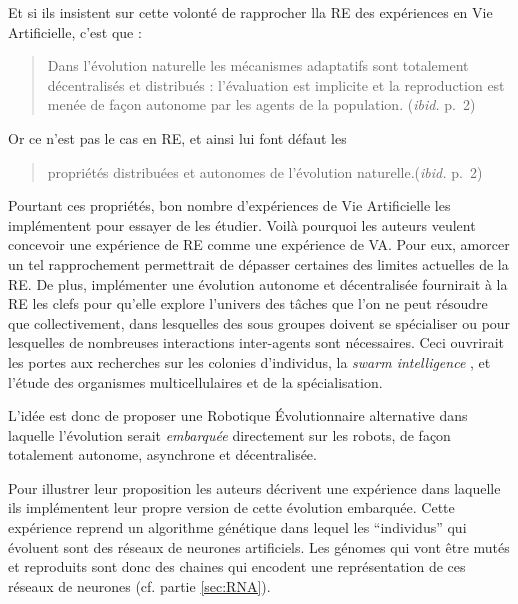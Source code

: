 Et si ils insistent sur cette volonté de rapprocher lla RE des expériences en Vie Artificielle, c'est que :

\begin{quote}

   Dans l'évolution naturelle les mécanismes adaptatifs sont totalement décentralisés et distribués : l'évaluation est implicite et la reproduction est menée de façon autonome par les agents de la population. (\emph{ibid.} p.~2)

\end{quote}

Or ce n'est pas le cas en RE, et ainsi lui font défaut les

\begin{quote}

   propriétés distribuées et autonomes de l'évolution naturelle.(\emph{ibid.} p.~2)

\end{quote}

Pourtant ces propriétés, bon nombre d'expériences de Vie Artificielle les implémentent pour essayer de les étudier. Voilà pourquoi les auteurs veulent concevoir une expérience de RE comme une expérience de VA. Pour eux, amorcer un tel rapprochement permettrait de dépasser certaines des limites actuelles de la RE. De plus, implémenter une évolution autonome et décentralisée fournirait à la RE les clefs pour qu'elle explore l'univers des tâches que l'on ne peut résoudre que collectivement, dans lesquelles des sous groupes doivent se spécialiser ou pour lesquelles de nombreuses interactions inter-agents sont nécessaires. Ceci ouvrirait les portes aux recherches sur les colonies d'individus, la \emph{swarm intelligence} \citep{garnier2007biologicalprincipeswarmintelligence}, et l'étude des organismes multicellulaires et de la spécialisation.

L'idée est donc de proposer une Robotique \'Evolutionnaire alternative dans laquelle l'évolution serait \emph{embarquée} directement sur les robots, de façon totalement autonome, asynchrone et décentralisée.

Pour illustrer leur proposition les auteurs décrivent une expérience dans laquelle ils implémentent leur propre version de cette évolution embarquée. Cette expérience reprend un algorithme génétique dans lequel les ``individus'' qui évoluent sont des réseaux de neurones artificiels. Les génomes qui vont être mutés et reproduits sont donc des chaines qui encodent une représentation de ces réseaux de neurones (cf. partie \ref{sec:RNA}).
 
